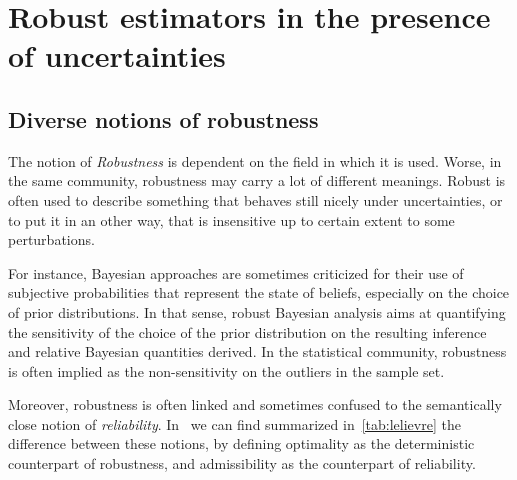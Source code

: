 \documentclass[../../Main_ManuscritThese.tex]{subfiles}
\begin{document}
\dominitoc
\faketableofcontents
\chapter{Robust estimators in the presence of uncertainties} 
\label{chap:robust_estimators}
\minitoc
\newpage
\subfileLocal{\pagestyle{contentStyle}}

\section{Diverse notions of robustness}
The notion of \emph{Robustness} is dependent on the field in which it is used. Worse, in the same community, robustness may carry a lot of different meanings. Robust is often used to describe something that behaves still nicely under uncertainties, or to put it in an other way, that is insensitive up to certain extent to some perturbations.

For instance, Bayesian approaches are sometimes criticized for their use of subjective probabilities that represent the state of beliefs, especially on the choice of prior distributions. In that sense, robust Bayesian analysis aims at quantifying the sensitivity of the choice of the prior distribution on the resulting inference and relative Bayesian quantities derived. In the statistical community, robustness is often implied as the non-sensitivity on the outliers in the sample set.

Moreover, robustness is often linked and sometimes confused to the semantically close notion of \emph{reliability}. In~\cite{lelievre_consideration_2016} we can find summarized in~\cref{tab:lelievre} the difference between these notions,  by defining optimality as the deterministic counterpart of robustness, and admissibility as the counterpart of reliability.
\end{document}
